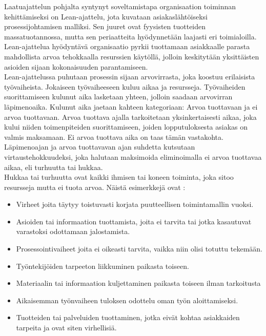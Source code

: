 \documentclass[finnish,12pt,a4paper,pdftex]{article}
\begin{document}
Laatuajattelun pohjalta syntynyt soveltamistapa organisaation toiminnan kehittämiseksi on Lean-ajattelu, jota kuvataan asiakaslähtöiseksi prosessijohtamisen malliksi. Sen juuret ovat fyysisten tuotteiden massatuotannossa, mutta sen periaatteita hyödynnetään laajasti eri toimialoilla. Lean-ajattelua hyödyntävä organisaatio pyrkii tuottamaan asiakkaalle parasta mahdollista arvoa tehokkaalla resurssien käytöllä, jolloin keskitytään yksittäisten asioiden sijaan kokonaisuuden parantamiseen. \citep{leanit}\\

Lean-ajattelussa puhutaan prosessin sijaan arvovirrasta, joka koostuu erilaisista työvaiheista. Jokaiseen työvaiheeseen kuluu aikaa ja resursseja. Työvaiheiden suorittamiseen kulunut aika lasketaan yhteen, jolloin saadaan arvovirran läpimenoaika. Kulunut aika jaetaan kahteen kategoriaan: Arvoa tuottavaan ja ei arvoa tuottavaan. Arvoa tuottava ajalla tarkoitetaan yksinkertaisesti aikaa, joka kului niiden toimenpiteiden suorittamiseen, joiden lopputuloksesta asiakas on valmis maksamaan. Ei arvoa tuottava aika on taas tämän vastakohta. Läpimenoajan ja arvoa tuottavavan ajan suhdetta kutsutaan virtaustehokkuudeksi, joka halutaan maksimoida eliminoimalla ei arvoa tuottavaa aikaa, eli turhuutta tai hukkaa. \citep{leanthinking}\\

Hukkaa tai turhuutta ovat kaikki ihmisen tai koneen toiminta, joka sitoo resursseja mutta ei tuota arvoa. Näistä esimerkkejä ovat \citep{leanthinking}:
\begin{itemize}
\setlength{\itemsep}{0pt}
    \item Virheet joita täytyy toistuvasti korjata puutteellisen toimintamallin vuoksi.
    \item Asioiden tai informaation tuottamista, joita ei tarvita tai jotka kasautuvat varastoksi odottamaan jalostamista.
    \item Prosessointivaiheet joita ei oikeasti tarvita, vaikka niin olisi totuttu tekemään.
    \item Työntekijöiden tarpeeton liikkuminen paikasta toiseen.
    \item Materiaalin tai informaation kuljettaminen paikasta toiseen ilman tarkoitusta
    \item Aikaisemman työnvaiheen tuloksen odottelu oman työn aloittamiseksi.
    \item Tuotteiden tai palveluiden tuottaminen, jotka eivät kohtaa asiakkaiden tarpeita ja ovat siten virhellisiä.
\end{itemize}
\end{document}
